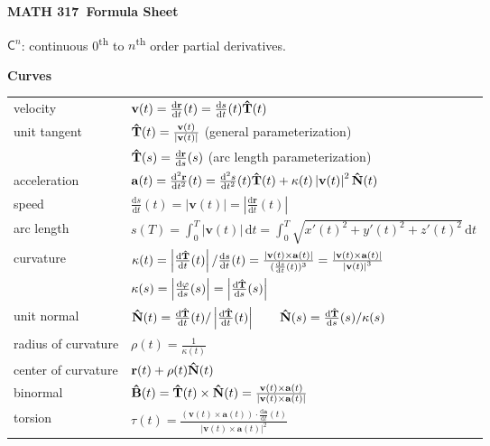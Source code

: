 \documentclass[10pt]{article}
\newcommand\sectionheading[1]{\begin{center}\large{\textbf{#1}}\end{center}\normalsize}
\newcommand\heading[1]{\smallskip\textbf{#1}\smallskip}
\newcommand{\C}{{\mathsf C}}
\newcommand{\N}{{\mathbb N}}
\newcommand{\ka}{\kappa}
\renewcommand{\phi}{\varphi}
\newcommand{\ts}{\textsuperscript}
\newcommand{\norm}[1]{\left|#1\right|}
\newcommand{\bv}[1]{\mathbf{#1}}                                %
\newcommand{\uv}[1]{{\bm{\hat{\textnormal{\bfseries #1}}}}}     %
\renewcommand{\N}{\uv N}
\newcommand{\T}{\uv T}
\newcommand{\B}{\uv B}
\renewcommand{\r}{\bv r}
\renewcommand{\v}{\bv v}
\renewcommand{\d}{\,\mathrm{d}}
\newcommand{\dv}[2]{\frac{\mathrm{d} #1}{\mathrm{d} #2}}
\newcommand{\ddv}[2]{\frac{\mathrm{d}^2 #1}{\mathrm{d} #2^2}}
\newcommand*{\course}{MATH 317}
\begin{document}
\begin{center}
    \huge{\textbf{\course \ Formula Sheet}}
\end{center}

\begin{multicols*}{2}

$\C^n$: continuous 0\ts{th} to $n$\ts{th} order partial derivatives.

\sectionheading{Curves}

{\tabulinesep=1pt
\begin{tabu}{@{}ll}
    velocity & $\v(t)=\dv\r t(t)=\dv st(t)\T(t)$ \\
    unit tangent & $\T(t)=\frac{\v(t)}{\norm{\v(t)}}$ \quad (general parameterization) \\
    & $\T(s)=\dv\r s(s)$ \hspace{4pt} (arc length parameterization) \\
    acceleration & $\bv a(t)=\ddv\r t(t)=\ddv st(t)\T(t)+\ka(t)\norm{\v(t)}^2\N(t)$ \\
    speed & $\dv st(t)=\norm{\v(t)}=\norm{\dv\r t(t)}$ \\
    arc length & $s(T)=\int_0^T\norm{\v(t)}\d t=\int_0^T\sqrt{x'(t)^2+y'(t)^2+z'(t)^2}\d t$ \\
    curvature & $\ka(t)=\norm{\dv{\T}{t}(t)}/\dv st(t)=\frac{\norm{\v(t)\times\bv a(t)}}{(\dv st(t))^3}=\frac{\norm{\v(t)\times\bv a(t)}}{\norm{\v(t)}^3}$ \\
    & $\ka(s)=\norm{\dv \phi s(s)}=\norm{\dv{\T}{s}(s)}$ \\
    unit normal & $\N(t)=\dv{\T}{t}(t)/\norm{\dv{\T}{t}(t)} \qquad \N(s)=\dv{\T}{s}(s)/\ka(s)$ \\
    radius of curvature & $\rho(t)=\frac{1}{\ka(t)}$ \\
    center of curvature & $\r(t)+\rho(t)\N(t)$ \\
    binormal & $\B(t)=\T(t)\times\N(t)=\frac{\v(t)\times\bv a(t)}{\norm{\v(t)\times\bv a(t)}}$ \\
    torsion & $\tau(t)=\frac{(\v(t)\times\bv a(t))\cdot\dv{\bv a}{t}(t)}{\norm{\v(t)\times\bv a(t)}^2}$ 
\end{tabu}}



\end{multicols*}
\end{document}
